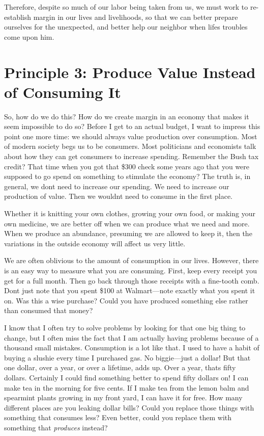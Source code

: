 Therefore, despite so much of our labor being taken from us, we must
work to re-establish margin in our lives and livelihoods, so that we
can better prepare ourselves for the unexpected, and better help our
neighbor when life{\textquotesingle}s troubles come upon him.

\section{Principle 3: Produce Value Instead of Consuming It}

So, how do we do this?
How do we create margin in an economy that makes it seem impossible to
do so? Before I get to an actual budget, I want to impress this point
one more time: we should always value production over consumption.
Most of modern society
begs us to be
consumers. Most politicians and economists talk about how they can get
consumers to increase spending.
Remember the Bush tax
credit?  That time when you got that \$300 check some years ago that
you were supposed to go spend on something to stimulate the economy?
 The truth is, in
general, we don{\textquotesingle}t need to increase our spending. We
need to increase our production of value. Then we
wouldn{\textquotesingle}t need to consume in the first place.


Whether it is knitting your own clothes, growing your own food, or
making your own medicine, we are better off when we can produce what we
need and more. When we produce an abundance, presuming we are allowed
to keep it, then the variations in the outside economy will affect us
very little. 


We are often oblivious to the amount of consumption in our lives.
However, there is an easy way to measure what you are consuming. First,
keep every receipt you get for a full month. Then go back through those
receipts with a fine-tooth comb. Don{\textquotesingle}t just note that
you spent \$100 at Walmart—note exactly what you spent it on. Was this
a wise purchase? Could you have produced something else rather than
consumed that money?  


I know that I often try to solve problems by looking for that one big
thing to change, but I often miss the fact that I am actually having
problems because of a thousand small mistakes. Consumption is a lot
like that. I used to have a habit of buying a slushie every time I
purchased gas. No biggie—just a dollar!  But that one dollar, over a
year, or over a lifetime, adds up. Over a year, that{\textquotesingle}s
fifty dollars. Certainly I could find something better to spend fifty
dollars on!  I can make tea in the morning for five cents. If I make
tea from the lemon balm and spearmint plants growing in my front yard,
I can have it for free. How many different places are you leaking
dollar bills?  Could
you replace those
things with something that consumes less?  Even better, could you
replace them with
something that \textit{produces} instead?


